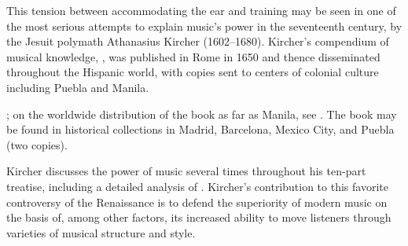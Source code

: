 This tension between accommodating the ear and training may be seen in one of
the most serious attempts to explain music's power in the seventeenth century,
by the Jesuit polymath Athanasius Kircher (1602--1680).
Kircher's compendium of musical knowledge, , was
published in Rome in 1650 and thence disseminated throughout the Hispanic world,
with copies sent to centers of colonial culture including Puebla and Manila.%
\begin{Footnote}
    \Autocites{Findlen:Kircher}{Godwin:KircherTheater};
    on the worldwide distribution of the book as far as Manila, see
    \autocite[48--50]{Irving:Colonial}.  
    The book may be found in historical collections in Madrid, Barcelona, Mexico
    City, and Puebla (two copies).
\end{Footnote}
Kircher discusses the power of music several times throughout his ten-part
treatise, including a detailed analysis of .%
    \Autocite
    [, : .] 
    {Kircher:Musurgia}
Kircher's contribution to this favorite controversy of the Renaissance is to
defend the superiority of modern music on the basis of, among other factors, its
increased ability to move listeners through varieties of musical structure and
style.

